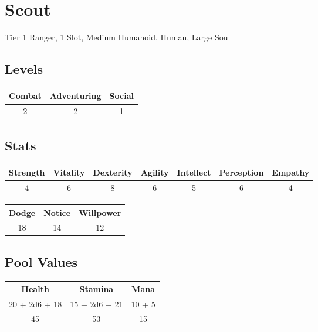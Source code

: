 \section{Scout}
Tier 1 Ranger, 1 Slot, Medium Humanoid, Human, Large Soul\\

\subsection{Levels}
\begin{minipage}[H]{1\textwidth}
	\centering
	\begin{tabular}[c]{|c | c | c|}
		\hline
		Combat & Adventuring & Social\\
		\hline
		2 & 2 & 1\\
		\hline
	\end{tabular}
\end{minipage}

\subsection{Stats}
\begin{minipage}[H]{1\textwidth}
	\centering
	\begin{tabular}[c]{|c | c | c | c | c | c | c|}
		\hline
		Strength & Vitality & Dexterity & Agility & Intellect & Perception & Empathy\\
		\hline
		4 & 6 & 8 & 6 & 5 & 6 & 4\\
		\hline
	\end{tabular}
\end{minipage}
\bigbreak

\begin{minipage}[H]{1\textwidth}
	\centering
	\begin{tabular}[c]{|c | c | c|}
		\hline
		Dodge & Notice & Willpower\\
		\hline
		18 & 14 & 12\\
		\hline
	\end{tabular}
\end{minipage}

\subsection{Pool Values}
\bigbreak
\begin{minipage}[H]{1\textwidth}
	\centering
	\begin{tabular}[c]{|c | c | c|}
		\hline
		Health & Stamina & Mana\\
		\hline
		20 + 2d6 + 18 & 15 + 2d6 + 21 & 10 + 5 \\
		45 & 53 & 15\\
		\hline
	\end{tabular}
\end{minipage}
\noindent


